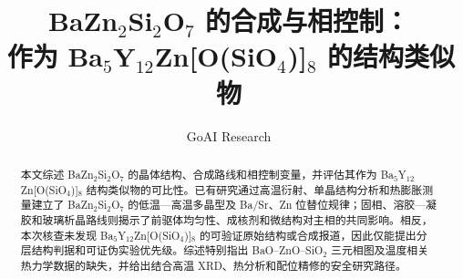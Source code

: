 \documentclass[11pt]{ctexart}
\title{BaZn$_2$Si$_2$O$_7$ 的合成与相控制：\texorpdfstring{\\}{ }\,作为 Ba$_5$Y$_{12}$Zn[O(SiO$_4$)]$_8$ 的结构类似物}
\author{GoAI Research}
\date{}
\begin{document}
\maketitle

\begin{abstract}
本文综述 BaZn$_2$Si$_2$O$_7$ 的晶体结构、合成路线和相控制变量，并评估其作为 Ba$_5$Y$_{12}$Zn[O(SiO$_4$)]$_8$ 结构类似物的可比性。已有研究通过高温衍射、单晶结构分析和热膨胀测量建立了 BaZn$_2$Si$_2$O$_7$ 的低温—高温多晶型及 Ba\slash Sr、Zn 位替位规律；固相、溶胶—凝胶和玻璃析晶路线则揭示了前驱体均匀性、成核剂和微结构对主相的共同影响。相反，本次核查未发现 Ba$_5$Y$_{12}$Zn[O(SiO$_4$)]$_8$ 的可验证原始结构或合成报道，因此仅能提出分层结构判据和可证伪实验优先级。综述特别指出 BaO--ZnO--SiO$_2$ 三元相图及温度相关热力学数据的缺失，并给出结合高温 XRD、热分析和配位精修的安全研究路径。
\end{abstract}









\clearpage


\end{document}

